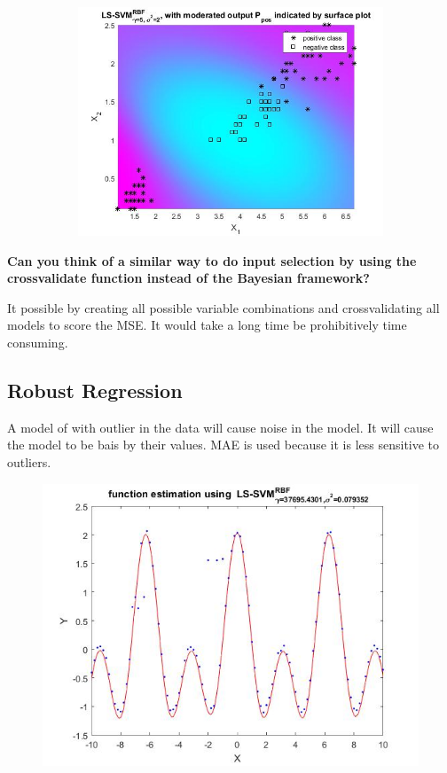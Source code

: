 \documentclass[11pt,oneside,a4paper]{article}
\begin{document}
\begin{figure}[H]
\begin{subfigure}[b]{0.4\textwidth}
		\includegraphics[width=\textwidth]{../Figures/sig_2_bayes}
		
	\end{subfigure}
\end{figure}

\textbf{Can you think of a similar way to do input selection by
using the crossvalidate function instead of the Bayesian framework?}

 It possible by creating all possible variable combinations and crossvalidating all models to score the MSE. It would take a long time be prohibitively time consuming. 
\subsection{Robust Regression}
A model of with outlier in the data will cause noise in the model. It will cause the model to be bais by their values. MAE is used because it is less sensitive to outliers. 
\begin{figure}[H]
	\centering
	\includegraphics[scale=0.4]{../Figures/robust}
\end{figure}
\end{document}
